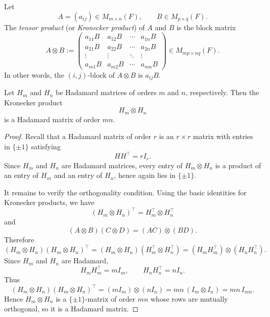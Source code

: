 \documentclass[11pt, a4paper]{ctexrep}
\begin{document}
\begin{definition}
    Let
    \[
        A=(a_{ij})\in M_{m\times n}(F),
        \qquad
        B\in M_{p\times q}(F).
    \]
    The \emph{tensor product} (or \emph{Kronecker product}) of \(A\) and \(B\) is the block matrix
    \[
        A\otimes B
        :=
        \begin{pmatrix}
            a_{11}B & a_{12}B & \cdots & a_{1n}B \\
            a_{21}B & a_{22}B & \cdots & a_{2n}B \\
            \vdots  & \vdots  & \ddots & \vdots  \\
            a_{m1}B & a_{m2}B & \cdots & a_{mn}B
        \end{pmatrix}
        \in M_{mp\times nq}(F).
    \]
    In other words, the \((i,j)\)-block of \(A\otimes B\) is \(a_{ij}B\).
\end{definition}

\begin{theorem}\label{thm:kronecker-hadamard}
    Let \(H_m\) and \(H_n\) be Hadamard matrices of orders \(m\) and \(n\), respectively.
    Then the Kronecker product
    \[
        H_m \otimes H_n
    \]
    is a Hadamard matrix of order \(mn\).
\end{theorem}

\begin{proof}
    Recall that a Hadamard matrix of order \(r\) is an \(r\times r\) matrix with entries in
    \(\{\pm1\}\) satisfying
    \[
        HH^\top=rI_r.
    \]
    Since \(H_m\) and \(H_n\) are Hadamard matrices, every entry of \(H_m\otimes H_n\) is a product
    of an entry of \(H_m\) and an entry of \(H_n\), hence again lies in \(\{\pm1\}\).

    It remains to verify the orthogonality condition. Using the basic identities for Kronecker products,
    we have
    \[
        (H_m\otimes H_n)^\top=H_m^\top\otimes H_n^\top
    \]
    and
    \[
        (A\otimes B)(C\otimes D)=(AC)\otimes(BD).
    \]
    Therefore
    \[
        (H_m\otimes H_n)(H_m\otimes H_n)^\top
        =(H_m\otimes H_n)(H_m^\top\otimes H_n^\top)
        =(H_mH_m^\top)\otimes(H_nH_n^\top).
    \]
    Since \(H_m\) and \(H_n\) are Hadamard,
    \[
        H_mH_m^\top=mI_m,
        \qquad
        H_nH_n^\top=nI_n.
    \]
    Thus
    \[
        (H_m\otimes H_n)(H_m\otimes H_n)^\top
        =(mI_m)\otimes(nI_n)
        =mn\,(I_m\otimes I_n)
        =mn\,I_{mn}.
    \]
    Hence \(H_m\otimes H_n\) is a \(\{\pm1\}\)-matrix of order \(mn\) whose rows are mutually orthogonal,
    so it is a Hadamard matrix.
\end{proof}
\end{document}
